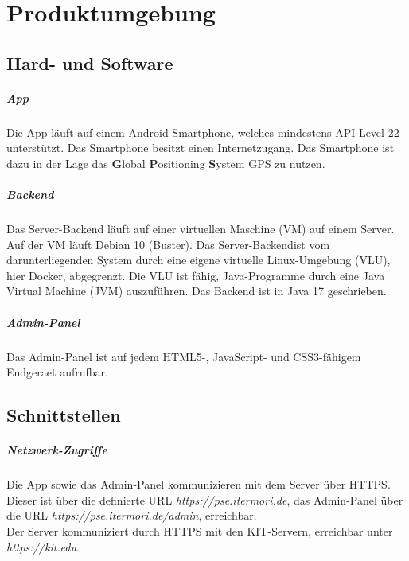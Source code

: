 \newpage
\chapter{Produktumgebung}

\section{Hard- und Software}
    \paragraph{App}
        Die App läuft auf einem \Gls{Android}-\Gls{Smartphone}, welches mindestens \Gls{API-Level} 22 unterstützt.
        Das \Gls{Smartphone} besitzt einen Internetzugang.
        Das \Gls{Smartphone} ist dazu in der Lage das \textbf{G}lobal \textbf{P}ositioning \textbf{S}ystem \Gls{GPS} zu nutzen.

    \paragraph{Backend}
        Das \Gls{Server}-\Gls{Backend} läuft auf einer virtuellen Maschine (\Gls{VM}) auf einem \Gls{Server}.
        Auf der \Gls{VM} läuft \Gls{Debian} 10 (Buster).
        Das \Gls{Server}-\Gls{Backend}ist vom darunterliegenden System durch eine eigene virtuelle Linux-Umgebung (\Gls{VLU}), hier \Gls{Docker}, abgegrenzt.
        Die \Gls{VLU} ist fähig, \Gls{Java}-Programme durch eine Java Virtual Machine (\Gls{JVM}) auszuführen.
        Das \Gls{Backend} ist in \Gls{Java} 17 geschrieben.

    \paragraph{Admin-Panel}
        Das \Gls{Admin-Panel} ist auf jedem \Gls{HTML5}-, \Gls{JavaScript}- und \Gls{CSS3}-fähigem \Gls{Endgeraet} aufrufbar.

\section{Schnittstellen}
    \paragraph{Netzwerk-Zugriffe}
        Die App sowie das \Gls{Admin-Panel} kommunizieren mit dem \Gls{Server} über \Gls{HTTPS}. Dieser ist über die definierte \Gls{URL} \textit{https://pse.itermori.de},
        das \Gls{Admin-Panel} über die \Gls{URL} \textit{https://pse.itermori.de/admin}, erreichbar. \\
        Der \Gls{Server} kommuniziert durch \Gls{HTTPS} mit den \Gls{KIT}-Servern, erreichbar unter \textit{https://kit.edu}.
